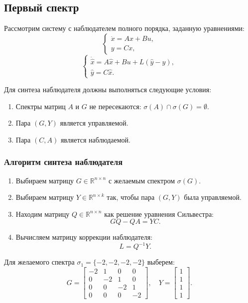 \subsection{Первый спектр}

Рассмотрим систему с наблюдателем полного порядка, заданную уравнениями:
\[
\begin{cases}
    \dot{x} = Ax + Bu, \\
    y = Cx,
\end{cases}
\]
\[
\begin{cases}
    \dot{\hat{x}} = A\hat{x} + Bu + L(\hat{y} - y), \\
    \hat{y} = C\hat{x}.
\end{cases}
\]

Для синтеза наблюдателя должны выполняться следующие условия:
\begin{enumerate}
    \item Спектры матриц $A$ и $G$ не пересекаются: $\sigma(A) \cap \sigma(G) = \emptyset$.
    \item Пара $(G, Y)$ является управляемой.
    \item Пара $(C, A)$ является наблюдаемой.
\end{enumerate}


\subsubsection{Алгоритм синтеза наблюдателя}

\begin{enumerate}
    \item Выбираем матрицу $G \in \mathbb{R}^{n \times n}$ с желаемым спектром $\sigma(G)$.
    \item Выбираем матрицу $Y \in \mathbb{R}^{n \times k}$ так, чтобы пара $(G, Y)$ была управляемой.
    \item Находим матрицу $Q \in \mathbb{R}^{n \times n}$ как решение уравнения Сильвестра:
    \[
    GQ - QA = YC.
    \]
    \item Вычисляем матрицу коррекции наблюдателя:
    \[
    L = Q^{-1}Y.
    \]
\end{enumerate}

Для желаемого спектра $\sigma_1 = \{-2, -2, -2, -2\}$ выберем:
\[
G = \begin{bmatrix}
    -2 & 1 & 0 & 0 \\
    0 & -2 & 1 & 0 \\
    0 & 0 & -2 & 1 \\
    0 & 0 & 0 & -2
\end{bmatrix}, \quad
Y = \begin{bmatrix}
    1 \\
    1 \\
    1 \\
    1
\end{bmatrix}.
\]

